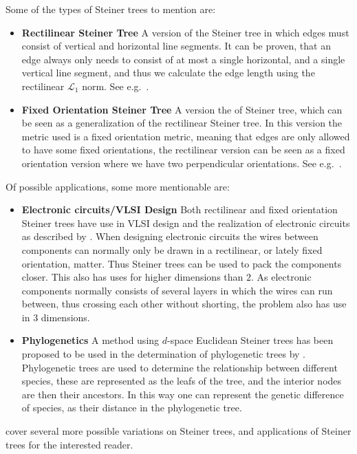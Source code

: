 Some of the types of Steiner trees to mention are:
%
\begin{itemize}
\item \textbf{Rectilinear Steiner Tree} \quad A version of the Steiner tree in which
  edges must consist of vertical and horizontal line segments. It can be proven,
  that an edge always only needs to consist of at most a single horizontal, and
  a single vertical line segment, and thus we calculate the edge length using
  the rectilinear $\mathcal{L}_1$ norm. See e.g.~\textcite[ch.~3]{brazil2015}.
\item \textbf{Fixed Orientation Steiner Tree} \quad A version the of Steiner tree,
  which can be seen as a generalization of the rectilinear Steiner tree. In this
  version the metric used is a fixed orientation metric, meaning that edges are
  only allowed to have some fixed orientations, the rectilinear version can be
  seen as a fixed orientation version where we have two perpendicular
  orientations. See e.g.~\textcite[ch.~2]{brazil2015}.
\end{itemize}
%
Of possible applications, some more mentionable are:
%
\begin{itemize}
\item \textbf{Electronic circuits/VLSI Design} \quad Both rectilinear and fixed
  orientation Steiner trees have use in VLSI design and the realization of
  electronic circuits as described by
  \textcite[sec.~2.7,sec~3.6]{brazil2015}. When designing electronic circuits
  the wires between components can normally only be drawn in a rectilinear, or
  lately fixed orientation, matter. Thus Steiner trees can be used to pack the
  components closer. This also has uses for higher dimensions than $2$. As
  electronic components normally consists of several layers in which the wires
  can run between, thus crossing each other without shorting, the problem also
  has use in $3$ dimensions.
\item \textbf{Phylogenetics} \quad A method using $d$-space Euclidean Steiner trees
  has been proposed to be used in the determination of phylogenetic trees by
  \textcite{brazil2009}. Phylogenetic trees are used to determine the
  relationship between different species, these are represented as the leafs of
  the tree, and the interior nodes are then their ancestors. In this way one can
  represent the genetic difference of species, as their distance in the
  phylogenetic tree.
\end{itemize}
%
\textcite{brazil2015} cover several more possible variations on Steiner trees,
and applications of Steiner trees for the interested reader.


